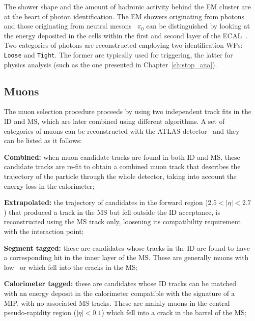 			The shower shape and the amount of hadronic activity behind the \ac{EM} cluster are at the heart of photon identification. The \ac{EM} showers originating from photons and those originating from neutral mesons \eg\ $\pi_0$ can be distinguished by looking at the energy deposited in the cells within the first and second layer of the \ac{ECAL}~\cite{ATL-PHYS-PUB-2016-014}. Two categories of photons are reconstructed employing two identification \acp{WP}: \texttt{Loose} and \texttt{Tight}. The former are typically used for triggering, the latter for physics analysis (such as the one presented in Chapter~\ref{ch:stop_ana}).

		\subsection*{Muons}

			The muon selection procedure proceeds by using two independent track fits in the \ac{ID} and \ac{MS}, which are later combined using different algorithms. A set of categories of muons can be reconstructed with the \ac{ATLAS} detector~\cite{Aad:2016jkr} and they can be listed as it follows: 

			\begin{description}
				\item \textbf{Combined:} when muon candidate tracks are found in both \ac{ID} and \ac{MS}, these candidate tracks are re-fit to obtain a combined muon track that describes the trajectory of the particle through the whole detector, taking into account the energy loss in the calorimeter;

				\item \textbf{Extrapolated:} the trajectory of candidates in the forward region ($2.5 < |\eta| < 2.7$) that produced a track in the \ac{MS} but fell outside the \ac{ID} acceptance, is reconstructed using the \ac{MS} track only, loosening its compatibility requirement with the interaction point;

				\item \textbf{Segment tagged:} these are candidates whose tracks in the \ac{ID} are found to have a corresponding hit in the inner layer of the \ac{MS}. These are generally muons with low \pt\ or which fell into the cracks in the \ac{MS};

				\item \textbf{Calorimeter tagged:} these are candidates whose \ac{ID} tracks can be matched with an energy deposit in the calorimeter compatible with the signature of a \ac{MIP}, with no associated \ac{MS} tracks. These are mainly muons in the central pseudo-rapidity region ($|\eta| < 0.1$) which fell into a crack in the barrel of the \ac{MS};
			\end{description}

